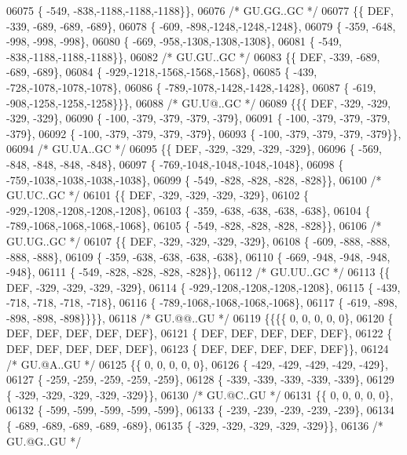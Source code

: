 \begin{DoxyCode}
06075 \{ -549, -838,-1188,-1188,-1188\}\},
06076 \textcolor{comment}{/* GU.GG..GC */}
06077 \{\{  DEF, -339, -689, -689, -689\},
06078 \{ -609, -898,-1248,-1248,-1248\},
06079 \{ -359, -648, -998, -998, -998\},
06080 \{ -669, -958,-1308,-1308,-1308\},
06081 \{ -549, -838,-1188,-1188,-1188\}\},
06082 \textcolor{comment}{/* GU.GU..GC */}
06083 \{\{  DEF, -339, -689, -689, -689\},
06084 \{ -929,-1218,-1568,-1568,-1568\},
06085 \{ -439, -728,-1078,-1078,-1078\},
06086 \{ -789,-1078,-1428,-1428,-1428\},
06087 \{ -619, -908,-1258,-1258,-1258\}\}\},
06088 \textcolor{comment}{/* GU.U@..GC */}
06089 \{\{\{  DEF, -329, -329, -329, -329\},
06090 \{ -100, -379, -379, -379, -379\},
06091 \{ -100, -379, -379, -379, -379\},
06092 \{ -100, -379, -379, -379, -379\},
06093 \{ -100, -379, -379, -379, -379\}\},
06094 \textcolor{comment}{/* GU.UA..GC */}
06095 \{\{  DEF, -329, -329, -329, -329\},
06096 \{ -569, -848, -848, -848, -848\},
06097 \{ -769,-1048,-1048,-1048,-1048\},
06098 \{ -759,-1038,-1038,-1038,-1038\},
06099 \{ -549, -828, -828, -828, -828\}\},
06100 \textcolor{comment}{/* GU.UC..GC */}
06101 \{\{  DEF, -329, -329, -329, -329\},
06102 \{ -929,-1208,-1208,-1208,-1208\},
06103 \{ -359, -638, -638, -638, -638\},
06104 \{ -789,-1068,-1068,-1068,-1068\},
06105 \{ -549, -828, -828, -828, -828\}\},
06106 \textcolor{comment}{/* GU.UG..GC */}
06107 \{\{  DEF, -329, -329, -329, -329\},
06108 \{ -609, -888, -888, -888, -888\},
06109 \{ -359, -638, -638, -638, -638\},
06110 \{ -669, -948, -948, -948, -948\},
06111 \{ -549, -828, -828, -828, -828\}\},
06112 \textcolor{comment}{/* GU.UU..GC */}
06113 \{\{  DEF, -329, -329, -329, -329\},
06114 \{ -929,-1208,-1208,-1208,-1208\},
06115 \{ -439, -718, -718, -718, -718\},
06116 \{ -789,-1068,-1068,-1068,-1068\},
06117 \{ -619, -898, -898, -898, -898\}\}\}\},
06118 \textcolor{comment}{/* GU.@@..GU */}
06119 \{\{\{\{    0,    0,    0,    0,    0\},
06120 \{  DEF,  DEF,  DEF,  DEF,  DEF\},
06121 \{  DEF,  DEF,  DEF,  DEF,  DEF\},
06122 \{  DEF,  DEF,  DEF,  DEF,  DEF\},
06123 \{  DEF,  DEF,  DEF,  DEF,  DEF\}\},
06124 \textcolor{comment}{/* GU.@A..GU */}
06125 \{\{    0,    0,    0,    0,    0\},
06126 \{ -429, -429, -429, -429, -429\},
06127 \{ -259, -259, -259, -259, -259\},
06128 \{ -339, -339, -339, -339, -339\},
06129 \{ -329, -329, -329, -329, -329\}\},
06130 \textcolor{comment}{/* GU.@C..GU */}
06131 \{\{    0,    0,    0,    0,    0\},
06132 \{ -599, -599, -599, -599, -599\},
06133 \{ -239, -239, -239, -239, -239\},
06134 \{ -689, -689, -689, -689, -689\},
06135 \{ -329, -329, -329, -329, -329\}\},
06136 \textcolor{comment}{/* GU.@G..GU */}

\end{DoxyCode}
